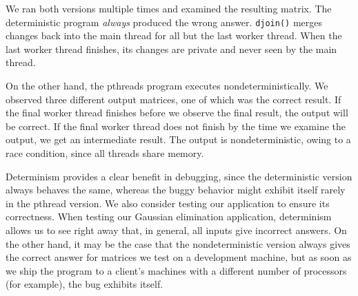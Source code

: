 We ran both versions multiple times and examined the resulting matrix.
The deterministic program \emph{always}
produced the wrong answer. {\tt djoin()} merges changes back into the main
thread for all but the last worker thread. When the last worker thread
finishes, its changes are private and never seen by the main thread.

On the other hand, the pthreads program executes nondeterministically. We
observed three different output matrices, one of which was the correct result.
If the final worker thread finishes before we observe the final result, the
output will be correct. If the final worker thread does not finish by the time
we examine the output, we get an intermediate result. The output is
nondeterministic, owing to a race condition, since all threads share memory.

Determinism provides a clear benefit in debugging, since the deterministic
version always behaves the same, whereas the buggy behavior might exhibit itself
rarely in the pthread version.
We also consider testing our application to ensure its correctness.
When testing our Gaussian elimination application, determinism allows us to see
right away that, in general, all inputs give incorrect answers. On the other
hand, it may be the case that the nondeterministic version always gives
the correct answer for matrices we test on a development machine, but as soon as
we ship the program to a client's machines with a different number of processors
(for example), the bug exhibits itself.



\endinput

